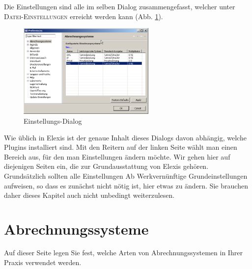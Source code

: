%

\label{settings}
Die Einstellungen sind alle im selben Dialog zusammengefasst, welcher unter
\textsc{Datei-Einstellungen} erreicht werden kann (Abb. \ref{fig:settingsmain}).
\begin{figure}[h]
\begin{center}
  \includegraphics[width=0.6\textwidth]{images/settingsmain}
  \caption{Einstellungs-Dialog}
  \label{fig:settingsmain}
\end{center}
\end{figure}


Wie üblich in Elexis ist der genaue Inhalt dieses Dialogs davon abhängig,
welche Plugins installiert sind. Mit den Reitern auf der linken Seite wählt man
einen Bereich aus, für den man Einstellungen ändern möchte. Wir gehen hier auf
diejenigen Seiten ein, die zur Grundausstattung von Elexis gehören. Grundsätzlich
sollten alle Einstellungen \glqq Ab Werk\grqq{}vernünftige Grundeinstellungen
aufweisen, so dass es zunächst nicht nötig ist, hier etwas zu ändern. Sie
brauchen daher dieses Kapitel auch nicht unbedingt weiterzulesen.

\section{Abrechnungssysteme}
\label{settings:abrechnungssystem}
Auf dieser Seite legen Sie fest, welche Arten von Abrechnungssystemen in Ihrer Praxis verwendet werden.

